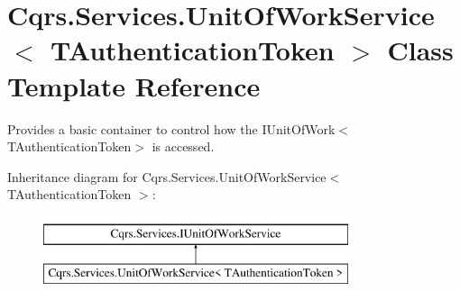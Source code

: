\hypertarget{classCqrs_1_1Services_1_1UnitOfWorkService}{}\section{Cqrs.\+Services.\+Unit\+Of\+Work\+Service$<$ T\+Authentication\+Token $>$ Class Template Reference}
\label{classCqrs_1_1Services_1_1UnitOfWorkService}


Provides a basic container to control how the I\+Unit\+Of\+Work$<$\+T\+Authentication\+Token$>$ is accessed.  


Inheritance diagram for Cqrs.\+Services.\+Unit\+Of\+Work\+Service$<$ T\+Authentication\+Token $>$\+:\begin{figure}[H]
\begin{center}
\leavevmode
\includegraphics[height=2.000000cm]{classCqrs_1_1Services_1_1UnitOfWorkService}
\end{center}
\end{figure}
